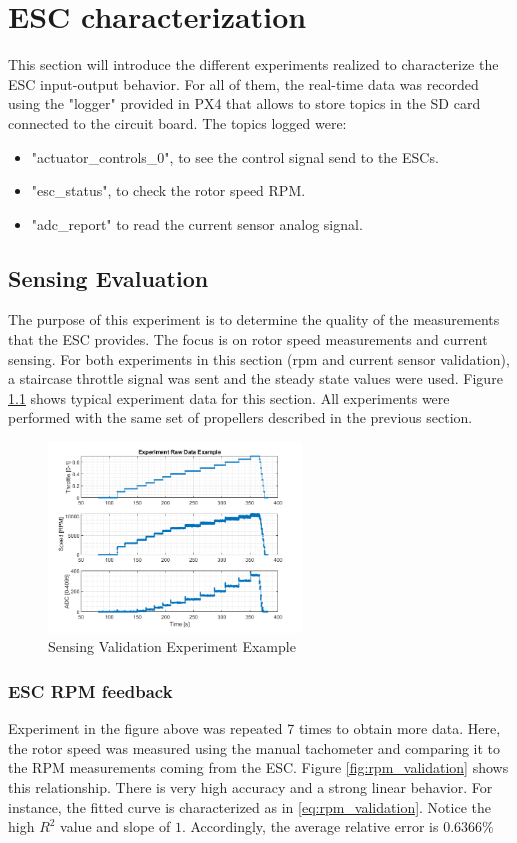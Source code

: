 \chapter{ESC characterization}
This section will introduce the different experiments realized to characterize the ESC input-output behavior. For all of them, the real-time data was recorded using the "logger" provided in PX4 that allows to store topics in the SD card connected to the circuit board. The topics logged were:
\begin{itemize}
	\item "actuator\_controls\_0", to see the control signal send to the ESCs.
	\item "esc\_status", to check the rotor speed RPM.
	\item "adc\_report" to read the current sensor analog signal.
\end{itemize}

\section{Sensing Evaluation}
The purpose of this experiment is to determine the quality of the measurements that the ESC provides. The focus is on rotor speed measurements and current sensing. For both experiments in this section (rpm and current sensor validation), a staircase throttle signal was sent and the steady state values were used. Figure \ref{fig:sensing_validation} shows typical experiment data for this section. All experiments were performed with the same set of propellers described in the previous section.

\begin{figure} 
    \centering
    \includegraphics[width=0.6\textwidth]{images/experiment_sample_data.png}
    \caption{Sensing Validation Experiment Example}
    \label{fig:sensing_validation}
\end{figure}

\subsection{ESC RPM feedback}
Experiment in the figure above was repeated 7 times to obtain more data. Here, the rotor speed was measured using the manual tachometer and comparing it to the RPM measurements coming from the ESC. Figure \ref{fig:rpm_validation} shows this relationship. There is very high accuracy and a strong linear behavior. For instance, the fitted curve is characterized as in \ref{eq:rpm_validation}. Notice the high $R^2$ value and slope of $1$. Accordingly, the average relative error is $0.6366\%$

